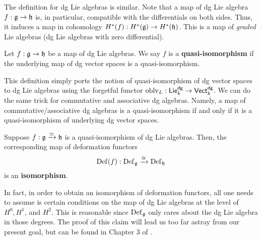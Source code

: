 \documentclass[11pt]{amsart}
\def\dgVect{{\sf Vect}^{\sf dg}}
\def\dgLie{{\sf Lie}^{\sf dg}}
\begin{document}
The definition for dg Lie algebras is similar. 
Note that a map of dg Lie algebra $f : \mathfrak g \to \mathfrak h$ is, in particular, compatible with the differentials on both sides. 
Thus, it induces a map in cohomology $H^*(f) : H^*(\mathfrak g) \to H^*(\mathfrak h)$.
This is a map of {\em graded} Lie algebras (dg Lie algebras with zero differential). 

\begin{dfn}
Let $f : \mathfrak g \to \mathfrak h$ be a map of dg Lie algebras. 
We say $f$ is a {\bf quasi-isomorphism} if the underlying map of dg vector spaces is a quasi-isomorphism.
\end{dfn}

This definition simply ports the notion of quasi-isomorphism of dg vector spaces to dg Lie algebras using the forgetful functor $\oblv_L : \dgLie_k \to \dgVect_k$. 
We can do the same trick for commutative and associative dg algebras.
Namely, a map of commutative/associative dg algebras is a quasi-isomorphism if and only if it is a quasi-isomorphism of underlying dg vector spaces. 


\begin{thm}
Suppose $f : \mathfrak g \xrightarrow{\simeq} \mathfrak h$ is a quasi-isomorphism of dg Lie algebras. 
Then, the corresponding map of deformation functors
\[
{\rm Def}(f) : {\rm Def}_\mathfrak g \xrightarrow{\cong} {\rm Def}_\mathfrak h
\]
is an {\bf isomorphism}. 
\end{thm}

In fact, in order to obtain an isomorphism of deformation functors, all one needs to assume is certain conditions on the map of dg Lie algebras at the level of $H^0, H^1$, and $H^2$. 
This is reasonable since ${\rm Def}_\mathfrak g$ only cares about the dg Lie algebra in those degrees.
The proof of this claim will lead us too far astray from our present goal, but can be found in Chapter 3 of \cite{Manetti1999}. 


%

%  

\end{document}
